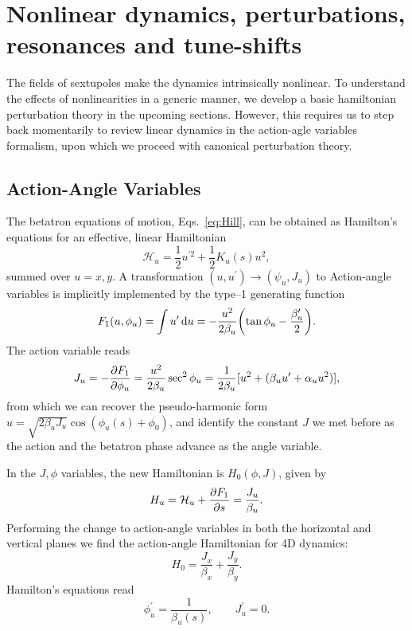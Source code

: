 \section{Nonlinear dynamics, perturbations, resonances and tune-shifts}
The fields of sextupoles make the dynamics intrinsically nonlinear. To understand the effects of nonlinearities in a generic manner, we develop a basic hamiltonian perturbation theory in the upcoming sections. However, this requires us to step back momentarily to review linear dynamics in the action-agle variables formalism, upon which we proceed with canonical perturbation theory.
\subsection{Action-Angle Variables}
The betatron equations of motion, Eqs.~\eqref{eq:Hill}, can be obtained as Hamilton's equations for an effective, linear Hamiltonian
\begin{equation}
    \mathcal{H}_u=\frac{1}{2}u^{\prime2}+\frac{1}{2}K_u(s)u^2,
\end{equation}
summed over $u=x,y$.
A transformation $(u,u^\prime)\to(\psi_u, J_u)$ to Action-angle variables is implicitly implemented by the type--1 generating function \cite{lee_accelerator_2004}
\begin{equation}
    F_1(u,\phi_u)=\int{u}^\prime\dd{{u}}=-\frac{u^2}{2\beta_u}\qty(\tan \phi_u-\frac{\beta_u^\prime}{2}).
\end{equation}
The action variable reads
\begin{equation}
    J_u=-\pdv{F_1}{\phi_u} = \frac{u^2}{2\beta_u}\sec^2\phi_u = \frac{1}{2\beta_u}[u^2 + (\beta_u u^\prime + \alpha_u u^2)],
    \label{eq:action}
\end{equation}
from which we can recover the pseudo-harmonic form $u=\sqrt{2\beta_u J_u}\cos(\phi_u(s)+\phi_0)$, and identify the constant $J$ we met before as the action and the betatron phase advance as the angle variable.

In the $J,\phi$ variables, the new Hamiltonian is $H_0(\phi, J)$,  given by
\begin{equation}
    H_u=\mathcal{H}_u+\pdv{F_1}{s} = \frac{J_u}{\beta_u}.
\end{equation}
Performing the change to action-angle variables in both the horizontal and vertical planes we find the action-angle Hamiltonian for 4D dynamics:
\begin{equation}
    H_0= \frac{J_x}{\beta_x} +  \frac{J_y}{\beta_y}.
\end{equation}
Hamilton's equations read
\begin{equation}
    \phi_u^\prime = \frac{1}{\beta_u(s)},\qquad J_u^\prime=0.
\end{equation}
